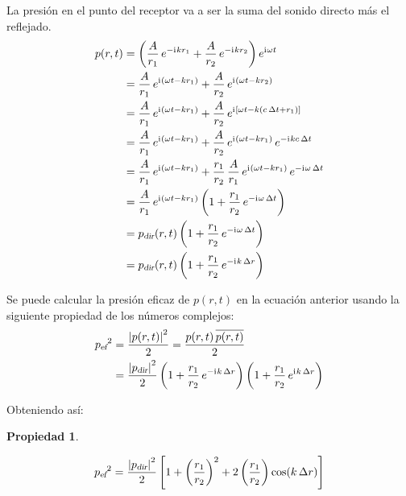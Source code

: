 \documentclass[a5paper,12pt,twoside]{book}
\newtheorem{prop}{{Propiedad}}[chapter]
\begin{document}
La presión en el punto del receptor va a ser la suma del sonido directo más el reflejado.
\begin{align*}
    p(r,t) &= \left( \frac{A}{r_1} \, e^{-\mathrm{i}\mkern1mu k r_1} + \frac{A}{r_2} \, e^{-\mathrm{i}\mkern1mu k r_2} \right) e^{\mathrm{i}\mkern1mu \omega t}
    \\
    &= \frac{A}{r_1} \, e^{\mathrm{i}\mkern1mu(\omega t - k r_1)} + \frac{A}{r_2} \, e^{\mathrm{i}\mkern1mu(\omega t - k r_2)}
    \\
    &= \frac{A}{r_1} \, e^{\mathrm{i}\mkern1mu(\omega t - k r_1)} + \frac{A}{r_2} \, e^{\mathrm{i}\mkern1mu[\omega t - k (c \, \Delta t + r_1)]}
    \\
    &= \frac{A}{r_1} \, e^{\mathrm{i}\mkern1mu(\omega t - k r_1)} + \frac{A}{r_2} \, e^{\mathrm{i}\mkern1mu(\omega t - k r_1)} \, e^{-\mathrm{i}\mkern1mu k c \, \Delta t}
    \\
    &= \frac{A}{r_1} \, e^{\mathrm{i}\mkern1mu(\omega t - k r_1)} + \frac{r_1}{r_2} \, \frac{A}{r_1} \, e^{\mathrm{i}\mkern1mu(\omega t - k r_1)} \, e^{-\mathrm{i}\mkern1mu \omega \, \Delta t}
    \\
    &= \frac{A}{r_1} \, e^{\mathrm{i}\mkern1mu(\omega t - k r_1)} \left( 1 + \frac{r_1}{r_2} \, e^{-\mathrm{i}\mkern1mu \omega \, \Delta t} \right)
    \\
    &= {{p}_\textsl{{dir}}} (r,t) \left( 1 + \frac{r_1}{r_2} \, e^{-\mathrm{i}\mkern1mu \omega \, \Delta t} \right)
    \\
    &= {{p}_\textsl{{dir}}} (r,t) \left( 1 + \frac{r_1}{r_2} \, e^{-\mathrm{i}\mkern1mu k \, \Delta r} \right)
\end{align*}

Se puede calcular la presión eficaz de $p(r,t)$ en la ecuación anterior usando la siguiente propiedad de los números complejos:
\begin{align*}
    {{{p}_\textsl{{ef}}}}^2 &= \frac{{\left| {p(r,t)} \right|}^2}{2} = \frac{p(r,t) \, \overline{p(r,t)}}{2}
    \\
    &= \frac{{\left| {{{p}_\textsl{{dir}}}} \right|}^2}{2} \left( 1 + \frac{r_1}{r_2} \, e^{-\mathrm{i}\mkern1mu k \, \Delta r} \right) \left( 1 + \frac{r_1}{r_2} \, e^{\mathrm{i}\mkern1mu k \, \Delta r} \right)
\end{align*}

Obteniendo así:

\begin{mdframed}[style=MyFrame1]
    \begin{prop}
    \end{prop}
    \begin{equation*}
        {{{p}_\textsl{{ef}}}}^2 = \frac{{\left| {{{p}_\textsl{{dir}}}} \right|}^2}{2} \left[ 1 + \left(\frac{r_1}{r_2}\right)^2 + 2 \left(\frac{r_1}{r_2}\right) \cos (k \, \Delta r) \right]
    \end{equation*}
\end{mdframed}
\end{document}
